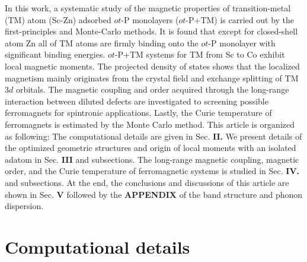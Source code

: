 \documentclass[%
superscriptaddress,
preprint,
showpacs,preprintnumbers,
 amsmath,amssymb,
prb,
]{revtex4-1}
\begin{document}
In this work, a systematic study of the magnetic properties of transition-metal
(TM) atom (Sc-Zn) adsorbed $ot$-P monolayers ($ot$-P+TM) is carried out
by the first-principles and Monte-Carlo methods. It is
found that except for closed-shell atom Zn all of TM atoms are
firmly binding onto the $ot$-P monolayer with significant binding
energies. $ot$-P+TM systems for TM from Sc to Co exhibit local magnetic moments. The projected density of states shows that the localized magnetism mainly originates from the crystal field and exchange splitting of TM 3$d$ orbitals. The magnetic coupling and order acquired through the long-range interaction between diluted defects are investigated to screening
possible ferromagnets for spintronic applications. Lastly, the Curie temperature of ferromagnets is estimated by the Monte Carlo method. This article is organized as following:
The computational details are given in Sec. \textbf{II.} We present details of the optimized geometric structures and origin of local moments with an isolated adatom in Sec. \textbf{III} and subsections. The long-range magnetic coupling, magnetic order, and the Curie temperature of ferromagnetic systems is studied in Sec. \textbf{IV.} and subsections. At the end, the conclusions and discussions of this article are shown in Sec. \textbf{V} followed by the \textbf{APPENDIX} of the band structure and phonon dispersion.


\section{Computational details}
\end{document}
